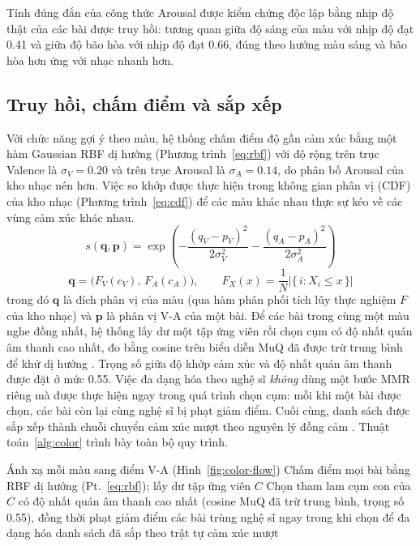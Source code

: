 \documentclass[../DoAn.tex]{subfiles}
\begin{document}
Tính đúng đắn của công thức Arousal được kiểm chứng độc lập bằng nhịp độ thật của các bài được truy hồi: tương quan giữa độ sáng của màu với nhịp độ đạt 0.41 và giữa độ bão hòa với nhịp độ đạt 0.66, đúng theo hướng màu sáng và bão hòa hơn ứng với nhạc nhanh hơn.

\subsection{Truy hồi, chấm điểm và sắp xếp}
\label{subsection:4.2.3}
Với chức năng gợi ý theo màu, hệ thống chấm điểm độ gần cảm xúc bằng một hàm Gaussian RBF dị hướng (Phương trình~\eqref{eq:rbf}) với độ rộng trên trục Valence là $\sigma_V = 0.20$ và trên trục Arousal là $\sigma_A = 0.14$, do phân bố Arousal của kho nhạc nén hơn. Việc so khớp được thực hiện trong không gian phân vị (CDF) của kho nhạc (Phương trình~\eqref{eq:cdf}) để các màu khác nhau thực sự kéo về các vùng cảm xúc khác nhau.
\begin{equation}\label{eq:rbf}
    s(\mathbf{q}, \mathbf{p}) = \exp\!\left(-\frac{(q_V - p_V)^2}{2\sigma_V^2} - \frac{(q_A - p_A)^2}{2\sigma_A^2}\right)
\end{equation}
\begin{equation}\label{eq:cdf}
    \mathbf{q} = \big(F_V(c_V),\, F_A(c_A)\big), \qquad
    F_X(x) = \frac{1}{N}\big|\{\, i : X_i \le x \,\}\big|
\end{equation}
trong đó $\mathbf{q}$ là đích phân vị của màu (qua hàm phân phối tích lũy thực nghiệm $F$ của kho nhạc) và $\mathbf{p}$ là phân vị V-A của một bài. Để các bài trong cùng một màu nghe đồng nhất, hệ thống lấy dư một tập ứng viên rồi chọn cụm có độ nhất quán âm thanh cao nhất, đo bằng cosine trên biểu diễn MuQ đã được trừ trung bình để khử dị hướng \cite{ethayarajh2019anisotropy, mu2018allbutthetop}. Trọng số giữa độ khớp cảm xúc và độ nhất quán âm thanh được đặt ở mức 0.55. Việc đa dạng hóa theo nghệ sĩ \textit{không} dùng một bước MMR riêng mà được thực hiện ngay trong quá trình chọn cụm: mỗi khi một bài được chọn, các bài còn lại cùng nghệ sĩ bị phạt giảm điểm. Cuối cùng, danh sách được sắp xếp thành chuỗi chuyển cảm xúc mượt theo nguyên lý đồng cảm \cite{starcke2021iso}. Thuật toán~\ref{alg:color} trình bày toàn bộ quy trình.

\begin{algorithm}[H]
\caption{Gợi ý danh sách phát theo màu}
\label{alg:color}
Ánh xạ mỗi màu sang điểm V-A (Hình~\ref{fig:color-flow})\;
Chấm điểm mọi bài bằng RBF dị hướng (Pt.~\eqref{eq:rbf}); lấy dư tập ứng viên $C$\;
Chọn tham lam cụm con của $C$ có độ nhất quán âm thanh cao nhất (cosine MuQ đã trừ trung bình, trọng số 0.55), đồng thời phạt giảm điểm các bài trùng nghệ sĩ ngay trong khi chọn để đa dạng hóa\;
\Return danh sách đã sắp theo trật tự cảm xúc mượt\;
\end{algorithm}
\end{document}
